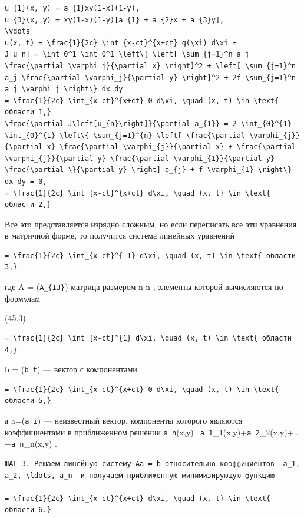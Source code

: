 \documentclass[
  ukrainian,
]{article}
\begin{document}
\begin{verbatim}
u_{1}(x, y) = a_{1}xy(1-x)(1-y),
u_{3}(x, y) = xy(1-x)(1-y)[a_{1} + a_{2}x + a_{3}y],
\vdots
u(x, t) = \frac{1}{2c} \int_{x-ct}^{x+ct} g(\xi) d\xi =
J[u_n] = \int_0^1 \int_0^1 \left\{ \left[ \sum_{j=1}^n a_j \frac{\partial \varphi_j}{\partial x} \right]^2 + \left[ \sum_{j=1}^n a_j \frac{\partial \varphi_j}{\partial y} \right]^2 + 2f \sum_{j=1}^n a_j \varphi_j \right\} dx dy
= \frac{1}{2c} \int_{x-ct}^{x+ct} 0 d\xi, \quad (x, t) \in \text{ области 1,}
\frac{\partial J\left[u_{n}\right]}{\partial a_{1}} = 2 \int_{0}^{1} \int_{0}^{1} \left\{ \sum_{j=1}^{n} \left[ \frac{\partial \varphi_{j}}{\partial x} \frac{\partial \varphi_{j}}{\partial x} + \frac{\partial \varphi_{j}}{\partial y} \frac{\partial \varphi_{1}}{\partial y} \frac{\partial \}{\partial y} \right] a_{j} + f \varphi_{1} \right\} dx dy = 0,
= \frac{1}{2c} \int_{x-ct}^{x+ct} d\xi, \quad (x, t) \in \text{ области 2,}
\end{verbatim}

Все это представляется изрядно сложным, но если переписать все эти
уравнения в матричной форме, то получится система линейных уравнений

\begin{verbatim}
= \frac{1}{2c} \int_{x-ct}^{-1} d\xi, \quad (x, t) \in \text{ области 3,}
\end{verbatim}

где A = (\texttt{A\_\{IJ\}}) матрица размером n \times n , элементы
которой вычисляются по формулам

(45.3)

\begin{verbatim}
= \frac{1}{2c} \int_{x-ct}^{1} d\xi, \quad (x, t) \in \text{ области 4,}
\end{verbatim}

b = (\texttt{b\_t}) --- вектор с компонентами

\begin{verbatim}
= \frac{1}{2c} \int_{x-ct}^{x+ct} 0 d\xi, \quad (x, t) \in \text{ области 5,}
\end{verbatim}

а a=(\texttt{a\_i}) --- неизвестный вектор, компоненты которого являются
коэффициентами в приближенном решении
\texttt{a\_n}(x,y)=\texttt{a\_1}\varphi\_1(x,y)+\texttt{a\_2}\varphi\_2(x,y)+\ldots+\texttt{a\_n}\varphi\_n(x,y)
.

\begin{verbatim}
ШАГ 3. Решаем линейную систему Aa = b относительно коэффициентов  a_1, a_2, \ldots, a_n  и получаем приближенную минимизирующую функцию

= \frac{1}{2c} \int_{x-ct}^{x+ct} d\xi, \quad (x, t) \in \text{ области 6.}
\end{verbatim}
\end{document}
